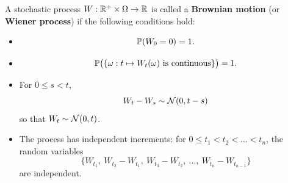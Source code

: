 \begin{definition} \label{def:Brownian-motion}
A stochastic process \(W : \mathbb{R}^+ \times \Omega \to \mathbb{R}\) is called a 
\textbf{Brownian motion} (or \textbf{Wiener process}) if the following conditions hold:
\begin{itemize}
    \item[i)] \begin{equation}
        \mathbb{P}(W_0 = 0) = 1.
    \end{equation}
    \item[ii)] \begin{equation}
        \mathbb{P}\big( \{ \omega : t \mapsto W_t(\omega) 
        \text{ is continuous} \} \big) = 1.
    \end{equation}
    \item[iii)]  For \(0 \leq s < t\), 
    \begin{equation}
        W_t - W_s \sim \mathcal{N}(0, t-s)
    \end{equation}
    so that $W_t \sim \mathcal{N}(0, t)$.
    \item[iv)] The process has independent increments: for 
    \(0 \leq t_1 < t_2 < \dots < t_n\), the random variables
    \begin{equation}
        \{ W_{t_1}, \ W_{t_2}-W_{t_1}, \ W_{t_3}-W_{t_2}, \ \dots, \ W_{t_n}-W_{t_{n-1}} \}
    \end{equation}
    are independent.
\end{itemize}
\end{definition}

